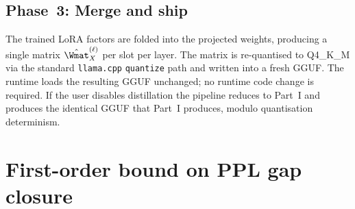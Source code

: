 \documentclass[11pt]{article}
\begin{document}
\subsection{Phase~3: Merge and ship}
\label{sec:phase3}
The trained LoRA factors are folded into the projected weights,
producing a single matrix $\hat{\Wmat}_X^{(\ell)}$ per slot per layer.
The matrix is re-quantised to Q4\_K\_M via the standard
\texttt{llama.cpp} \texttt{quantize} path and written into a fresh GGUF.
The runtime loads the resulting GGUF unchanged; no runtime code change
is required. If the user disables distillation the pipeline reduces to
Part~I and produces the identical GGUF that Part~I produces, modulo
quantisation determinism.

\section{First-order bound on PPL gap closure}
\label{sec:gapbound}
\end{document}
